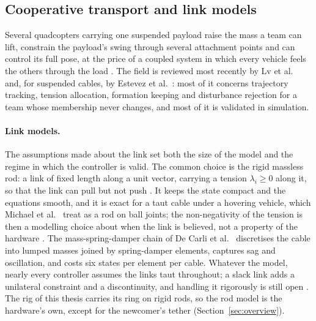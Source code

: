 
\subsection{Cooperative transport and link models}
\label{sec:lit_models}

Several quadcopters carrying one suspended payload raise the mass a team can lift, constrain the payload's
swing through several attachment points and can control its full pose, at the price of a coupled system in
which every vehicle feels the others through the load \cite{tudelft, mohammadiDecentralizedMotionControl2018}.
The field is reviewed most recently by Lv et al.\ \cite{lv2026review} and, for suspended cables, by Estevez et
al.\ \cite{estevezReviewAerialTransportation2024}: most of it concerns trajectory tracking, tension allocation,
formation keeping and disturbance rejection for a team whose membership never changes, and most of it is
validated in simulation.

\paragraph{Link models.} The assumptions made about the link set both the size of the model and the regime in
which the controller is valid. The common choice is the rigid massless rod: a link of fixed length along a unit
vector, carrying a tension $\lambda_i \ge 0$ along it, so that the link can pull but not push
\cite{efficient, wahbaKinodynamicMotionPlanning2024}. It keeps the state compact and the equations smooth, and
it is exact for a taut cable under a hovering vehicle, which Michael et al.\ \cite{michael2011cooperative} treat
as a rod on ball joints; the non-negativity of the tension is then a modelling choice about when the link is
believed, not a property of the hardware \cite{six2018flying}. The mass-spring-damper chain of
De Carli et al.\ \cite{distributedNMPC} discretises the cable into lumped masses joined by spring-damper
elements, captures sag and oscillation, and costs six states per element per cable. Whatever the model, nearly
every controller assumes the links taut throughout; a slack link adds a unilateral constraint and a
discontinuity, and handling it rigorously is still open \cite{efficient}. The rig of this thesis carries its
ring on rigid rods, so the rod model is the hardware's own, except for the newcomer's tether
(Section~\ref{sec:overview}).

